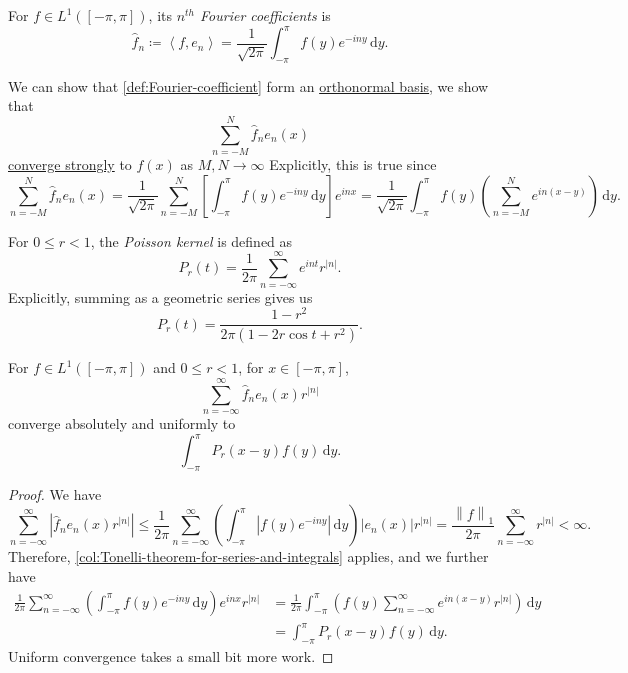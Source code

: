 \begin{definition}\label{def:Fourier-coefficient}
	For \(f\in L^{1}([-\pi , \pi ]) \), its \emph{\(n^{th}\) Fourier coefficients} is
	\[
		\hat{f} _n \coloneqq \left< f, e_{n}  \right> = \frac{1}{\sqrt{2\pi } }\int_{-\pi }^{\pi } f(y) e^{-iny}   \,\mathrm{d}y.
	\]
\end{definition}

We can show that \autoref{def:Fourier-coefficient} form an \hyperref[def:orthonormal-basis]{orthonormal basis}, we show that
\[
	\sum_{n=-M}^{N} \hat{f} _{n} e_{n} (x)
\]
\hyperref[def:strong-convergence]{converge strongly} to \(f(x)\) as \(M, N\to \infty \) Explicitly, this is true since
\[
	\sum_{n=-M}^{N} \hat{f} _{n} e_{n} (x) = \frac{1}{\sqrt{2\pi } }\sum_{n=-M}^{N} \left[\int_{-\pi}^{\pi} f(y) e^{-iny}  \,\mathrm{d}y \right]e^{inx} = \frac{1}{\sqrt{2\pi } } \int_{-\pi}^{\pi} f(y) \left(\sum_{n=-M}^{N} e^{in(x-y)} \right)\,\mathrm{d}y.
\]

\begin{definition}\label{def:Poisson-kernel}
	For \(0 \leq r <1\), the \emph{Poisson kernel} is defined as
	\[
		P_r(t) = \frac{1}{2\pi } \sum_{n=-\infty }^{\infty} e^{int} r^{\left\vert n \right\vert }.
	\]
	Explicitly, summing as a geometric series gives us
	\[
		P_r(t) = \frac{1 - r^{2} }{2\pi (1 - 2r \cos t + r^{2} )}.
	\]
\end{definition}
\begin{lemma}
	For \(f\in L^1([-\pi , \pi ])\) and \(0 \leq r < 1\), for \(x\in [-\pi , \pi ]\),
	\[
		\sum_{n=-\infty }^{\infty} \hat{f} _{n} e_{n} (x) r^{\left\vert n \right\vert }
	\]
	converge absolutely and uniformly to
	\[
		\int_{-\pi}^{\pi} P_r(x - y) f(y) \,\mathrm{d}y.
	\]
\end{lemma}
\begin{proof}
	We have
	\[
		\sum_{n=-\infty }^{\infty} \left\vert \hat{f} _{n} e_{n} (x) r ^{\left\vert n \right\vert } \right\vert \leq \frac{1}{2\pi }\sum_{n=-\infty }^{\infty} \left(\int_{-\pi}^{\pi} \left\vert f (y) e^{-iny}  \right\vert  \,\mathrm{d}y \right) \left\vert e_{n} (x) \right\vert r^{\left\vert n \right\vert } = \frac{\left\lVert f\right\rVert _1}{2\pi }\sum_{n=-\infty }^{\infty} r^{\left\vert n \right\vert }< \infty .
	\]
	Therefore, \autoref{col:Tonelli-theorem-for-series-and-integrals} applies, and we further have
	\[
		\begin{split}
			\frac{1}{2\pi }\sum_{n=-\infty }^{\infty} \left(\int_{-\pi }^{\pi }f(y) e^{-iny} \,\mathrm{d}y \right)e^{inx} r^{\left\vert n \right\vert }
			&= \frac{1}{2\pi }\int_{-\pi }^{\pi} \left(f(y) \sum_{n=-\infty }^{\infty} e^{in(x-y)}r^{\left\vert n \right\vert }  \right) \,\mathrm{d}y\\
			&= \int _{-\pi }^\pi P_r(x-y) f(y)\,\mathrm{d} y.
		\end{split}
	\]
	Uniform convergence takes a small bit more work.
\end{proof}

